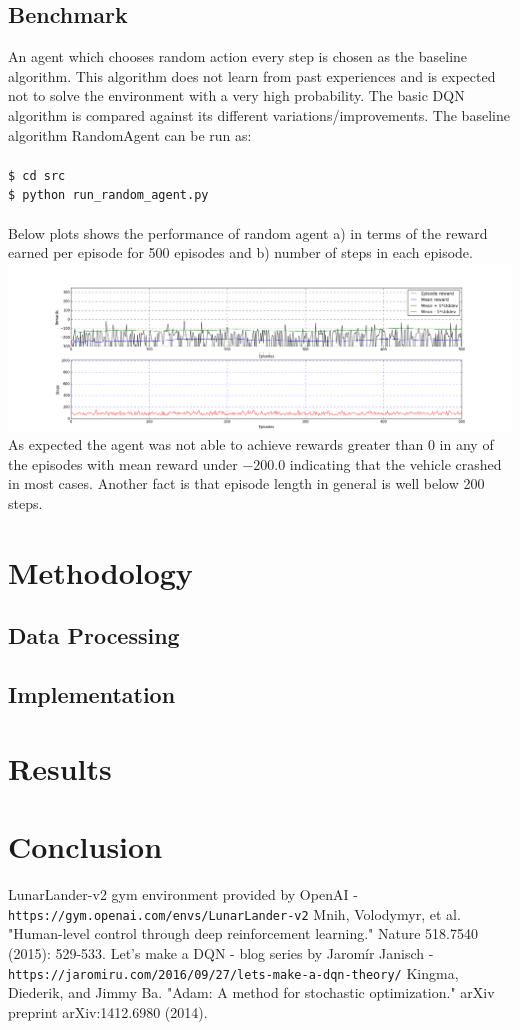 \documentclass{svproc}
\begin{document}
\subsection*{Benchmark}
An agent which chooses random action every step is chosen as the baseline algorithm. This algorithm does not learn from past experiences and is expected not to solve the environment with a very high probability. The basic DQN algorithm is compared against its different variations/improvements.
The baseline algorithm RandomAgent can be run as:\\
\texttt{\\\$ cd src}
\texttt{\\\$ python run\_random\_agent.py}\\\\
Below plots shows the performance of random agent a) in terms of the reward earned per episode for 500 episodes and b) number of steps in each episode.\\
\includegraphics[width=14cm,trim={5cm 0 0 0},clip]{img/randomagent}\\
As expected the agent was not able to achieve rewards greater than $0$ in any of the episodes with mean reward under $-200.0$ indicating that the vehicle crashed in most cases. Another fact is that episode length in general is well below 200 steps.
\section{Methodology}
\subsection*{Data Processing}
\subsection*{Implementation}
\section{Results}
\section{Conclusion}
\begin{thebibliography}{}
LunarLander-v2 gym environment provided by OpenAI - \texttt{https://gym.openai.com/envs/LunarLander-v2}
Mnih, Volodymyr, et al. "Human-level control through deep reinforcement learning." Nature 518.7540 (2015): 529-533.
Let’s make a DQN - blog series by Jaromír Janisch - \texttt{https://jaromiru.com/2016/09/27/lets-make-a-dqn-theory/}
Kingma, Diederik, and Jimmy Ba. "Adam: A method for stochastic optimization." arXiv preprint arXiv:1412.6980 (2014).
\end{thebibliography}
\end{document}
